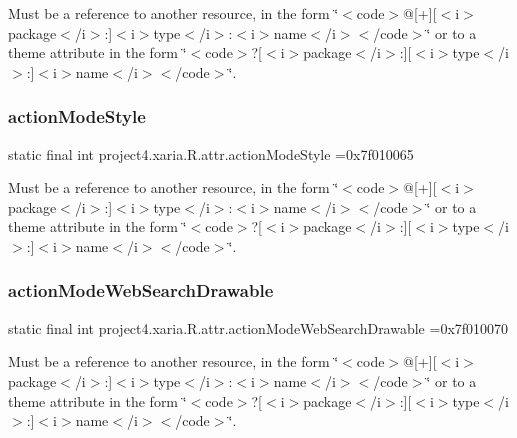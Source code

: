 Must be a reference to another resource, in the form \char`\"{}$<$code$>$@\mbox{[}+\mbox{]}\mbox{[}$<$i$>$package$<$/i$>$\+:\mbox{]}$<$i$>$type$<$/i$>$\+:$<$i$>$name$<$/i$>$$<$/code$>$\char`\"{} or to a theme attribute in the form \char`\"{}$<$code$>$?\mbox{[}$<$i$>$package$<$/i$>$\+:\mbox{]}\mbox{[}$<$i$>$type$<$/i$>$\+:\mbox{]}$<$i$>$name$<$/i$>$$<$/code$>$\char`\"{}. \mbox{\label{classproject4_1_1xaria_1_1R_1_1attr_a6440a901501080069ee6782346158452}} 
\subsubsection{\texorpdfstring{action\+Mode\+Style}{actionModeStyle}}
{\footnotesize\ttfamily static final int project4.\+xaria.\+R.\+attr.\+action\+Mode\+Style =0x7f010065\hspace{0.3cm}{\ttfamily [static]}}

Must be a reference to another resource, in the form \char`\"{}$<$code$>$@\mbox{[}+\mbox{]}\mbox{[}$<$i$>$package$<$/i$>$\+:\mbox{]}$<$i$>$type$<$/i$>$\+:$<$i$>$name$<$/i$>$$<$/code$>$\char`\"{} or to a theme attribute in the form \char`\"{}$<$code$>$?\mbox{[}$<$i$>$package$<$/i$>$\+:\mbox{]}\mbox{[}$<$i$>$type$<$/i$>$\+:\mbox{]}$<$i$>$name$<$/i$>$$<$/code$>$\char`\"{}. \mbox{\label{classproject4_1_1xaria_1_1R_1_1attr_a1829a965361078065ea493557c2717f3}} 
\subsubsection{\texorpdfstring{action\+Mode\+Web\+Search\+Drawable}{actionModeWebSearchDrawable}}
{\footnotesize\ttfamily static final int project4.\+xaria.\+R.\+attr.\+action\+Mode\+Web\+Search\+Drawable =0x7f010070\hspace{0.3cm}{\ttfamily [static]}}

Must be a reference to another resource, in the form \char`\"{}$<$code$>$@\mbox{[}+\mbox{]}\mbox{[}$<$i$>$package$<$/i$>$\+:\mbox{]}$<$i$>$type$<$/i$>$\+:$<$i$>$name$<$/i$>$$<$/code$>$\char`\"{} or to a theme attribute in the form \char`\"{}$<$code$>$?\mbox{[}$<$i$>$package$<$/i$>$\+:\mbox{]}\mbox{[}$<$i$>$type$<$/i$>$\+:\mbox{]}$<$i$>$name$<$/i$>$$<$/code$>$\char`\"{}. \mbox{\label{classproject4_1_1xaria_1_1R_1_1attr_ae1bdeba747bc65003cb910d0a8e7ed23}} 

